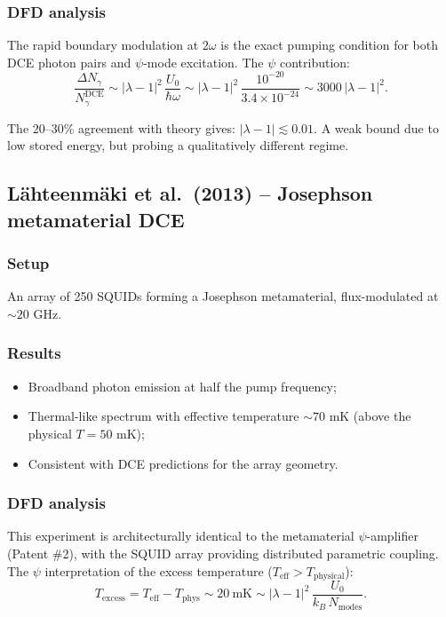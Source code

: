 \documentclass[12pt,letterpaper]{article}
\begin{document}
\subsubsection{DFD analysis}

The rapid boundary modulation at $2\omega$ is the exact pumping
condition for both DCE photon pairs and $\psi$-mode excitation.
The $\psi$ contribution:
\begin{equation}
  \frac{\Delta N_\gamma}{N_\gamma^{\text{DCE}}}
  \sim |\lambda - 1|^2\,\frac{U_0}{\hbar\omega}
  \sim |\lambda - 1|^2\,\frac{10^{-20}}{3.4\times 10^{-24}}
  \sim 3000\,|\lambda - 1|^2.
\end{equation}

The $20$--$30\%$ agreement with theory gives:
$|\lambda - 1| \lesssim 0.01$.  A weak bound due to low stored
energy, but probing a qualitatively different regime.

\subsection{L\"ahteenm\"aki et al.\ (2013) -- Josephson metamaterial DCE}

\subsubsection{Setup}
An array of 250 SQUIDs forming a Josephson metamaterial,
flux-modulated at $\sim 20$ GHz.

\subsubsection{Results}
\begin{itemize}[noitemsep]
  \item Broadband photon emission at half the pump frequency;
  \item Thermal-like spectrum with effective temperature $\sim 70$ mK
    (above the physical $T = 50$ mK);
  \item Consistent with DCE predictions for the array geometry.
\end{itemize}

\subsubsection{DFD analysis}

This experiment is architecturally identical to the metamaterial
$\psi$-amplifier (Patent \#2), with the SQUID array providing
distributed parametric coupling.  The $\psi$ interpretation of the
excess temperature ($T_{\text{eff}} > T_{\text{physical}}$):
\begin{equation}
  T_{\text{excess}} = T_{\text{eff}} - T_{\text{phys}}
  \sim 20~\text{mK}
  \sim |\lambda - 1|^2\,\frac{U_0}{k_B\,N_{\text{modes}}}.
\end{equation}
\end{document}
